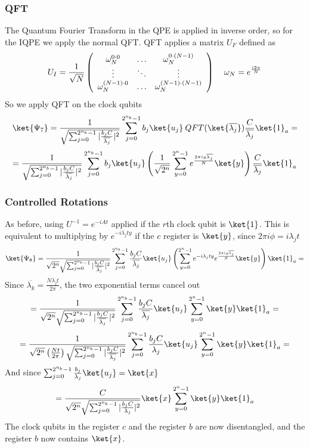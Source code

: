\documentclass[10pt]{article}
\begin{document}
\subsubsection{QFT}
The Quantum Fourier Transform in the QPE is applied in inverse order, so for the IQPE we apply the normal QFT. QFT applies a matrix $U_F$ defined as
$$U_I=\frac{1}{\sqrt{N}}\left(
	\begin{array}{c c c}
		\omega_N^{0\cdot 0}&\ldots&\omega_N^{0\cdot (N-1)}\\
		\vdots&\ddots&\vdots\\
		\omega_N^{(N-1)\cdot 0}&\ldots&\omega_N^{(N-1)\cdot(N-1)}
	\end{array}
\right)\:\:\:\:\:\omega_N=e^{\frac{i2\pi}{N}}$$
So we apply QFT on the clock qubits
$$\ket{\Psi_7}=\frac{1}{ \sqrt{\sum_{j=0}^{2^{n_b}-1}|\frac{b_jC}{\overline{\lambda_j}}|^2}}\sum_{j=0}^{2^{n_b}-1}b_j\ket{u_j}\:QFT(\ket{\overline{\lambda_j}})\frac{C}{\overline{\lambda_j}}\ket{1}_a=$$
$$=\frac{1}{ \sqrt{\sum_{j=0}^{2^{n_b}-1}|\frac{b_jC}{\overline{\lambda_j}}|^2}}\sum_{j=0}^{2^{n_b}-1}b_j\ket{u_j}\left(\frac{1}{\sqrt{2^n}}\sum_{y=0}^{2^n-1}e^{\frac{2\pi iy\overline{\lambda_j}}{N}}\ket{y}\right)\frac{C}{\overline{\lambda_j}}\ket{1}_a$$
\subsubsection{Controlled Rotations}
As before, using $U^{-1}=e^{-iAt}$ applied if the $r$th clock qubit is $\ket{1}$. This is equivalent to multiplying by $e^{-i\lambda_jty}$ if the $c$ register is $\ket{y}$, since $2\pi i\phi=i\lambda_j t$
$$\ket{\Psi_8}=\frac{1}{\sqrt{2^n}\sqrt{\sum_{j=0}^{2^{n_b}-1}|\frac{b_jC}{\overline{\lambda_j}}|^2}}\sum_{j=0}^{2^{n_b}-1}\frac{b_jC}{\overline{\lambda_j}}\ket{u_j}\left(\sum_{y=0}^{2^n-1}e^{-i\lambda_jty}e^{\frac{2\pi iy\overline{\lambda_j}}{N}}\ket{y}\right)\ket{1}_a=$$
Since $\overline{\lambda_k}=\frac{N\lambda_j t}{2\pi}$, the two exponential terms cancel out
$$=\frac{1}{\sqrt{2^n} \sqrt{\sum_{j=0}^{2^{n_b}-1}|\frac{b_jC}{\overline{\lambda_j}}|^2}}\sum_{j=0}^{2^{n_b}-1}\frac{b_jC}{\overline{\lambda_j}}\ket{u_j}\sum_{y=0}^{2^n-1}\ket{y}\ket{1}_a=$$
$$=\frac{1}{\sqrt{2^n}\left(\frac{Nt}{2\pi}\right) \sqrt{\sum_{j=0}^{2^{n_b}-1}|\frac{b_jC}{\overline{\lambda_j}}|^2}}\sum_{j=0}^{2^{n_b}-1}\frac{b_jC}{\lambda_j}\ket{u_j}\sum_{y=0}^{2^n-1}\ket{y}\ket{1}_a=$$
And since $\sum_{j=0}^{2^{n_b}-1}\frac{b_j}{\lambda_j}\ket{u_j}=\ket{x}$
$$=\frac{C}{\sqrt{2^n} \sqrt{\sum_{j=0}^{2^{n_b}-1}|\frac{b_jC}{\lambda_j}|^2}}\ket{x}\sum_{y=0}^{2^n-1}\ket{y}\ket{1}_a$$
The clock qubits in the register $c$ and the register $b$ are now disentangled, and the register $b$ now contains $\ket{x}$.
\end{document}
